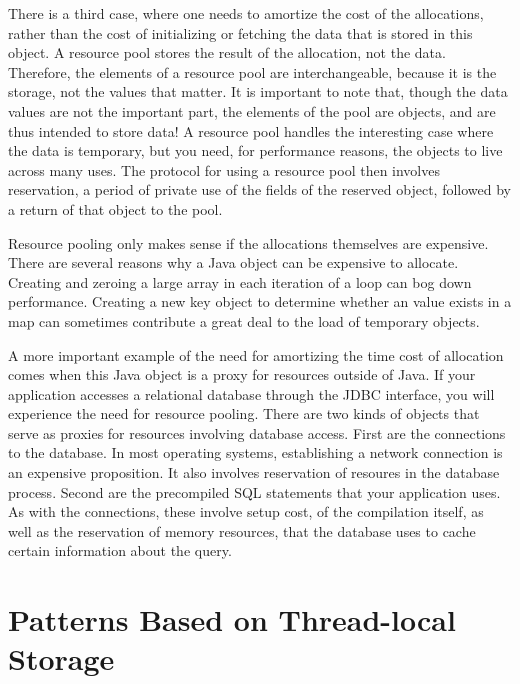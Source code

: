  There is a third case,
where one needs to amortize the cost of the allocations, rather than the cost of
initializing or fetching the data that is stored in this object. A resource pool
stores the result of the allocation, not the data. Therefore, the elements of a
resource pool are interchangeable, because it is the storage, not the values that
matter. It is important to note that, though the data values are not the
important part, the elements of the pool are objects, and are thus intended to
store data! A resource pool handles the interesting case where the data is
temporary, but you need, for performance reasons, the objects to live across many
uses. The protocol for using a resource pool then involves reservation, a period
of private use of the fields of the reserved object, followed by a return of that
object to the pool.

Resource pooling only makes sense if the allocations themselves are expensive.
There are several reasons why a Java object can be expensive to allocate.
Creating and zeroing a large array in each iteration of a
loop can bog down performance. Creating a new key object to determine whether an
value exists in a map can sometimes contribute a great deal to the load of
temporary objects.

A more important example of the need for amortizing the time cost of allocation
comes when this Java object is a proxy for resources outside of Java. If your
application accesses a relational database through the JDBC
interface, you will experience the need for resource pooling. There are two kinds
of objects that serve as proxies for resources involving database access. First
are the connections to the database. In most operating systems, establishing a
network connection is an expensive proposition. It also involves reservation of
resoures in the database process. Second are the precompiled SQL statements that
your application uses. As with the connections, these involve setup cost, of the
compilation itself, as well as the reservation of memory resources, that the
database uses to cache certain information about the query.

\section{Patterns Based on Thread-local Storage}

